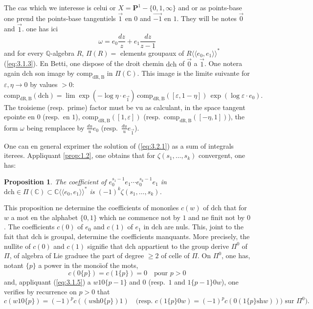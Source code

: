 \documentclass[11pt,a4paper]{article}
\theoremstyle{plain}
\newtheorem{proposition}[theorem]{Proposition}
\theoremstyle{definition}
\newcommand{\Q}{\mathbb{Q}}
\newcommand{\C}{\mathbb{C}}
\newcommand{\dR}{\mathrm{dR}}
\newcommand{\B}{\mathrm{B}}
\newcommand{\shuffle}{{\text{sh}}}
\newcommand{\comp}{\mathrm{comp}}
\begin{document}
The cas which we interesse is celui or $X = \mathbf{P}^1 - \{0,1,\infty\}$ and or as points-base one prend the points-base tangentiels $\vec{1}$ en $0$ and $\vec{-1}$ en $1$. They will be notes $\vec{0}$ and $\vec{1}$. one has ici
\[
\omega = e_0 \frac{dz}{z} + e_1 \frac{dz}{z-1}
\]
and for every $\Q$-algebra $R$, $\Pi(R) =$ elements groupaux of $R\langle\langle e_0,e_1 \rangle\rangle^*$ (\ref{eq:3.1.3}). En Betti, one dispose of the droit chemin $\mathrm{dch}$ of $\vec{0}$ a $\vec{1}$. One notera again $\mathrm{dch}$ son image by $\comp_{\dR,\B}$ in $\Pi(\C)$. This image is the limite suivante for $\varepsilon,\eta \to 0$ by values $> 0$:
\begin{equation}\label{eq:3.4.1}
\comp_{\dR,\B}(\mathrm{dch}) = \lim \exp(-\log \eta \cdot e_{\vec{1}})\, \comp_{\dR,\B}([\varepsilon,1-\eta])\, \exp(\log \varepsilon \cdot e_0).
\end{equation}
The troisieme (resp.~prime) factor must be vu as calculant, in the space tangent epointe en $0$ (resp.~en $1$), $\comp_{\dR,\B}([1,\varepsilon])$ (resp.~$\comp_{\dR,\B}([-\eta,1])$), the form $\omega$ being remplacee by $\frac{du}{u} e_0$ (resp.~$\frac{du}{u} e_{\vec{1}}$).

One can en general exprimer the solution of (\ref{eq:3.2.1}) as a sum of integrals iterees. Appliquant \ref{prop:1.2}, one obtains that for $\zeta(s_1,\ldots,s_k)$ convergent, one has:

\begin{proposition}\label{prop:3.5}
The coefficient of $e_0^{s_1-1} e_1 \cdots e_0^{s_k-1} e_1$ in $\mathrm{dch} \in \Pi(\C) \subset \C\langle\langle e_0,e_1 \rangle\rangle^*$ is $(-1)^k \zeta(s_1,\ldots,s_k)$.
\end{proposition}

This proposition ne determine the coefficients of mono\^mes $c(w)$ of $\mathrm{dch}$ that for $w$ a mot en the alphabet $\{0,1\}$ which ne commence not by $1$ and ne finit not by $0$. The coefficients $c(0)$ of $e_0$ and $c(1)$ of $e_1$ in $\mathrm{dch}$ are nuls. This, joint to the fait that $\mathrm{dch}$ is groupal, determine the coefficients manquants. More precisely, the nullite of $c(0)$ and $c(1)$ signifie that $\mathrm{dch}$ appartient to the group derive $\Pi^0$ of $\Pi$, of algebra of Lie graduee the part of degree $\geq 2$ of celle of $\Pi$. On $\Pi^0$, one has, notant $\{p\}$ a power in the mono\"{\i}of the mots,
\begin{equation}\label{eq:3.5.1}
c(0\{p\}) = c(1\{p\}) = 0 \quad \text{pour } p > 0
\end{equation}
and, appliquant (\ref{eq:3.1.5}) a $w 1 0\{p-1\}$ and $0$ (resp.~$1$ and $1\{p-1\} 0 w$), one verifies by recurrence on $p > 0$ that
\begin{equation}\label{eq:3.5.2}
c(w 1 0\{p\}) = (-1)^p c((w \shuffle 0\{p\}) 1) \quad \text{(resp. } c(1\{p\} 0 w) = (-1)^p c(0 (1\{p\} \shuffle w)) \text{) sur } \Pi^0\text{).}
\end{equation}
\end{document}
